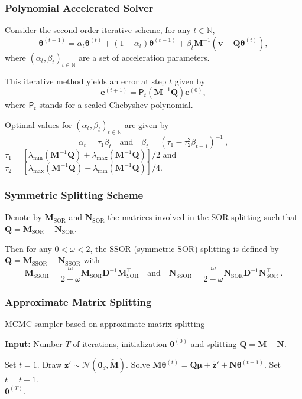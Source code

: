 \documentclass[aspectratio=169]{beamer}
\newcommand{\B}[1]{\mathbf{#1}} %
\newcommand{\Bs}[1]{\boldsymbol{#1}} %
\newcommand{\pr}[1]{\left(#1\right)} %
\begin{document}
\begin{frame}
\frametitle{Polynomial Accelerated Solver}
Consider the second-order iterative scheme, for any $t \in \mathbb{N}$, 
$$
\Bs{\theta}^{(t+1)} = \alpha_t\Bs{\theta}^{(t)} + (1-\alpha_t)\Bs{\theta}^{(t-1)} + \beta_t \B{M}^{-1}(\B{v}-\B{Q}\Bs{\theta}^{(t)}),
$$
where $(\alpha_t,\beta_t)_{t \in \mathbb{N}}$ are a set of acceleration parameters.

This iterative method yields an error at step $t$ given by 
\[\B{e}^{(t+1)}=\mathsf{P}_t(\B{M}^{-1}\B{Q})\B{e}^{(0)}, \]
where $\mathsf{P}_t$ stands for a scaled Chebyshev polynomial.

Optimal values for $(\alpha_t,\beta_t)_{t \in \mathbb{N}}$ are given by
$$
\alpha_t = \tau_1\beta_t  \quad \text{and} \quad \beta_t = \pr{\tau_1 - \tau_2^2\beta_{t-1}}^{-1} \ , 
$$
$\tau_1 = [\lambda_{\text{min}}(\B{M}^{-1}\B{Q}) + \lambda_{\text{max}}(\B{M}^{-1}\B{Q})]/2$ and $\tau_2 = [\lambda_{\text{max}}(\B{M}^{-1}\B{Q}) - \lambda_{\text{min}}(\B{M}^{-1}\B{Q})]/4$.
\end{frame}

\begin{frame}
\frametitle{Symmetric Splitting Scheme}
Denote by $\B{M}_{\text{SOR}}$ and $\B{N}_{\text{SOR}}$ the matrices involved in the SOR splitting such that $\B{Q} = \B{M}_{\text{SOR}} - \B{N}_{\text{SOR}}$.

Then for any $0<\omega<2$, the SSOR (symmetric SOR) splitting is defined by $\B{Q} = \B{M}_{\text{SSOR}} - \B{N}_{\text{SSOR}}$ with 
$$
\B{M}_{\text{SSOR}} = \frac{\omega}{2-\omega}\B{M}_{\text{SOR}}\B{D}^{-1}\B{M}_{\text{SOR}}^{\top} \quad \text{and} \quad \B{N}_{\text{SSOR}} = \frac{\omega}{2-\omega}\B{N}_{\text{SOR}}\B{D}^{-1}\B{N}_{\text{SOR}}^{\top} \ .
$$
\end{frame}

\begin{frame}
\frametitle{Approximate Matrix Splitting}
\begin{algorithm}[H]
\caption{MCMC sampler based on approximate matrix splitting}
\hspace*{\algorithmicindent} \textbf{Input:} Number $T$ of iterations, initialization $\Bs{\theta}^{(0)}$ and splitting $\B{Q} = \B{M} - \B{N}$.
\begin{algorithmic}[1]
\State Set $t = 1$.
    \State Draw $\tilde{\B{z}}' \sim \mathcal{N}(\B{0}_d,\tilde{\B{M}})$.   \Comment{ {\textcolor{blue}{$\tilde{\B{M}}=\B{D}$ or $2\pr{\B{D}+ 2\omega\B{I}_d}$.}}}
    \State Solve $\B{M}\Bs{\theta}^{(t)} = \B{Q}\Bs{\mu} + \tilde{\B{z}}' + \B{N}\Bs{\theta}^{(t-1)}$.
    \State Set $t = t + 1$.
\EndWhile\\
\Return $\Bs{\theta}^{(T)}$.
\end{algorithmic}
\end{algorithm}
\end{frame}
\end{document}
